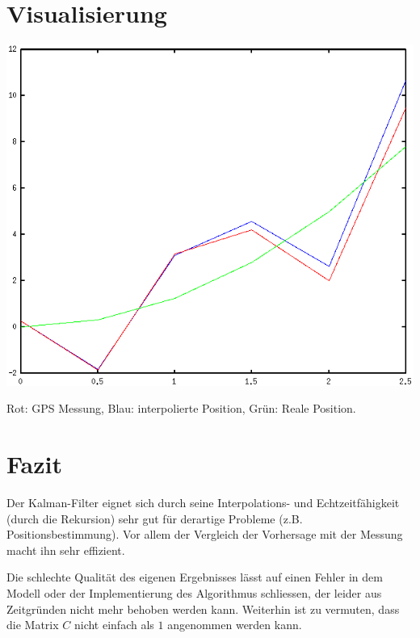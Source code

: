 \documentclass[12pt,a4paper]{article}
\begin{document}
\section{Visualisierung}
\includegraphics[scale=0.7]{graph}

Rot: GPS Messung, Blau: interpolierte Position, Grün: Reale Position.

\section{Fazit}
Der Kalman-Filter eignet sich durch seine Interpolations- und Echtzeitfähigkeit (durch die Rekursion) sehr gut für derartige Probleme (z.B. Positionsbestimmung). Vor allem der Vergleich der Vorhersage mit der Messung macht ihn sehr effizient.

Die schlechte Qualität des eigenen Ergebnisses lässt auf einen Fehler in dem Modell oder der Implementierung des Algorithmus schliessen, der leider aus Zeitgründen nicht mehr behoben werden kann. Weiterhin ist zu vermuten, dass die Matrix $C$ nicht einfach als $1$ angenommen werden kann.
\end{document}
